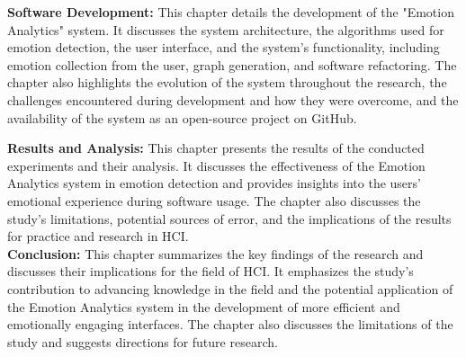 \begin{resumo-ingles}
  \textbf{Software Development:} This chapter details the development of the "Emotion Analytics" system. It discusses the system architecture, the algorithms used for emotion detection, the user interface, and the system's functionality, including emotion collection from the user, graph generation, and software refactoring. The chapter also highlights the evolution of the system throughout the research, the challenges encountered during development and how they were overcome, and the availability of the system as an open-source project on GitHub.
  \pagebreak

  \textbf{Results and Analysis:} This chapter presents the results of the conducted experiments and their analysis. It discusses the effectiveness of the Emotion Analytics system in emotion detection and provides insights into the users' emotional experience during software usage. The chapter also discusses the study's limitations, potential sources of error, and the implications of the results for practice and research in HCI.
  \\

  \textbf{Conclusion:} This chapter summarizes the key findings of the research and discusses their implications for the field of HCI. It emphasizes the study's contribution to advancing knowledge in the field and the potential application of the Emotion Analytics system in the development of more efficient and emotionally engaging interfaces. The chapter also discusses the limitations of the study and suggests directions for future research.
\end{resumo-ingles}
